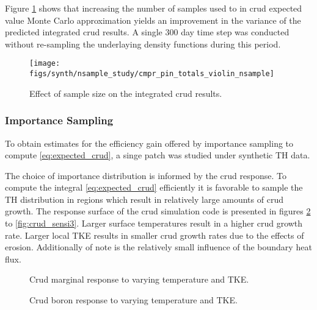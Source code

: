 Figure \ref{fig:cmprpintotalsviolinnsample} shows that increasing the number of samples used to in crud expected value Monte Carlo approximation yields an improvement in the variance of the predicted integrated crud results.  A single 300 day time step was conducted without re-sampling the underlaying density functions during this period.

\begin{figure}[H]
    \centering
    \texttt{[image: figs/synth/nsample\_study/cmpr\_pin\_totals\_violin\_nsample]}
    \caption{Effect of sample size on the integrated crud results.}
    \label{fig:cmprpintotalsviolinnsample}
\end{figure}



\subsubsection{Importance Sampling}
\label{sec:Importance Sampling}

To obtain estimates for the efficiency gain offered by importance sampling to compute \ref{eq:expected_crud}, a singe patch was studied under synthetic TH data.

The choice of importance distribution is informed by the crud response.  To compute the integral \ref{eq:expected_crud} efficiently it is favorable to sample the TH distribution in regions which result in relatively large amounts of crud growth.  The response surface of the crud simulation code is presented in figures \ref{fig:crud_sensi1} to \ref{fig:crud_sensi3}.  Larger surface temperatures result in a higher crud growth rate.  Larger local TKE results in smaller crud growth rates due to the effects of erosion.  Additionally of note is the relatively small influence of the boundary heat flux.

\begin{figure}[H]%
    \centering
    \qquad
    \caption[]{Crud marginal response to varying temperature and TKE.}%
    \label{fig:crud_sensi1}%
\end{figure}

\begin{figure}[H]%
    \centering
    \qquad
    \caption[]{Crud boron response to varying temperature and TKE.}%
    \label{fig:crud_sensi2}%
\end{figure}

